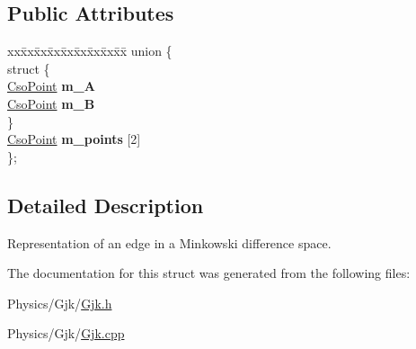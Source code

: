 \subsection*{Public Attributes}
\begin{DoxyCompactItemize}
\item 
\mbox{\label{structGjk_1_1CsoEdge_a5e14c47961fc0f7e6a7fa03a2e997f40}} 
\begin{tabbing}
xx\=xx\=xx\=xx\=xx\=xx\=xx\=xx\=xx\=\kill
union \{\\
\mbox{\label{unionGjk_1_1CsoEdge_1_1_0D18_a2ffa204621e9cb8c41b2be55e2974af0}} 
\>struct \{\\
\>\>\hyperlink{structGjk_1_1CsoPoint}{CsoPoint} {\bfseries m\_A}\\
\>\>\hyperlink{structGjk_1_1CsoPoint}{CsoPoint} {\bfseries m\_B}\\
\>\} \\
\>\hyperlink{structGjk_1_1CsoPoint}{CsoPoint} {\bfseries m\_points} \mbox{[}2\mbox{]}\\
\}; \\

\end{tabbing}\end{DoxyCompactItemize}


\subsection{Detailed Description}
Representation of an edge in a Minkowski difference space. 

The documentation for this struct was generated from the following files\+:\begin{DoxyCompactItemize}
\item 
Physics/\+Gjk/\hyperlink{Gjk_8h}{Gjk.\+h}\item 
Physics/\+Gjk/\hyperlink{Gjk_8cpp}{Gjk.\+cpp}\end{DoxyCompactItemize}
